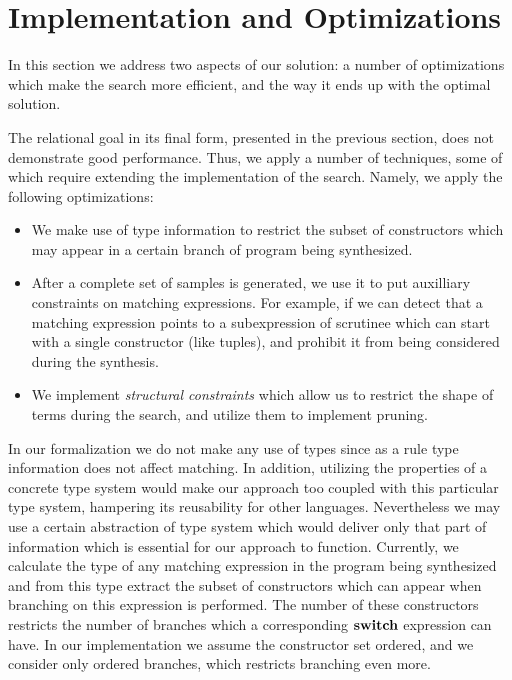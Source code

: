\section{Implementation and Optimizations}
\label{sec:optimization}

In this section we address two aspects of our solution: a number of optimizations which make the search more efficient, and
the way it ends up with the optimal solution.

The relational goal in its final form, presented in the previous section, does not demonstrate good performance. Thus, we apply a number
of techniques, some of which require extending the implementation of the search. Namely, we apply the following optimizations:

\begin{itemize}
\item We make use of type information to restrict the subset of constructors which may appear in a certain branch of
  program being synthesized.
\item After a complete set of samples is generated, we use it to put auxilliary constraints on matching expressions. For example,
  if we can detect that a matching expression points to a subexpression of scrutinee which can start with a single constructor (like
  tuples), and prohibit it from being considered during the synthesis.
\item We implement \emph{structural constraints} which allow us to restrict the shape of terms during the search, and
  utilize them to implement pruning.
\end{itemize}

In our formalization we do not make any use of types since as a rule type information does not affect matching. In addition,
utilizing the properties of a concrete type system would make our approach too coupled with this particular type system, hampering
its reusability for other languages. Nevertheless we may use a certain abstraction of type system which would deliver only
that part of information which is essential for our approach to function. Currently, we calculate the type of any matching expression in
the program being synthesized and from this type extract the subset of constructors which can appear when branching on this expression
is performed. The number of these constructors restricts the number of branches which a corresponding $\mathbf{switch}$ expression can have.
In our implementation we assume the constructor set ordered, and we consider only ordered branches, which restricts branching even more.

